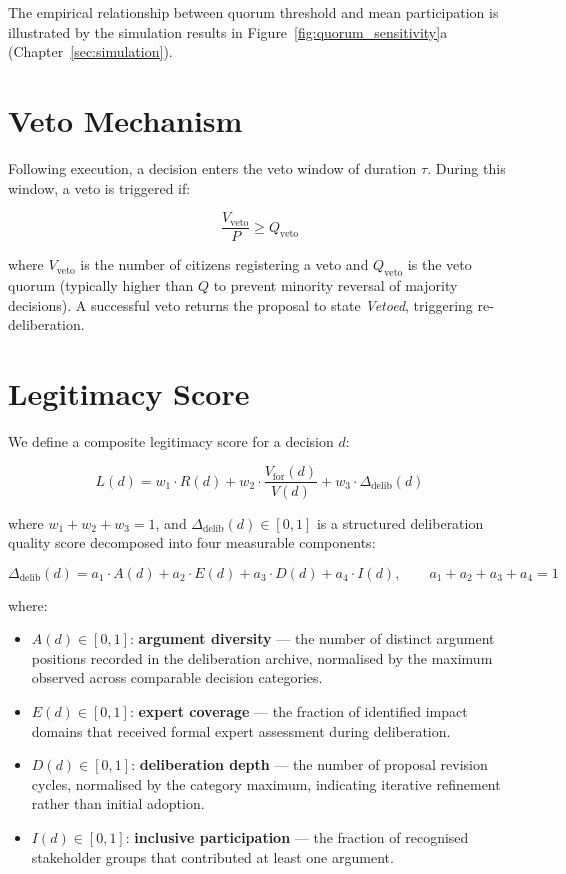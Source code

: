 \documentclass[12pt,a4paper,oneside]{report}
\begin{document}
The empirical relationship between quorum threshold and mean participation is illustrated by the simulation results in Figure~\ref{fig:quorum_sensitivity}a (Chapter~\ref{sec:simulation}).

\section{Veto Mechanism}

Following execution, a decision enters the veto window of duration $\tau$. During this window, a veto is triggered if:

\begin{equation}
  \label{eq:veto}
  \frac{V_{\text{veto}}}{P} \geq Q_{\text{veto}}
\end{equation}

where $V_{\text{veto}}$ is the number of citizens registering a veto and $Q_{\text{veto}}$ is the veto quorum (typically higher than $Q$ to prevent minority reversal of majority decisions). A successful veto returns the proposal to state \textit{Vetoed}, triggering re-deliberation.

\section{Legitimacy Score}

We define a composite legitimacy score for a decision $d$:

\begin{equation}
  \label{eq:legitimacy}
  L(d) = w_1 \cdot R(d) + w_2 \cdot \frac{V_{\text{for}}(d)}{V(d)} + w_3 \cdot \Delta_{\text{delib}}(d)
\end{equation}

where $w_1 + w_2 + w_3 = 1$, and $\Delta_{\text{delib}}(d) \in [0,1]$ is a structured deliberation quality score decomposed into four measurable components:

\begin{equation}
  \label{eq:delib}
  \Delta_{\text{delib}}(d) = a_1 \cdot A(d) + a_2 \cdot E(d) + a_3 \cdot D(d) + a_4 \cdot I(d), \qquad a_1 + a_2 + a_3 + a_4 = 1
\end{equation}

where:
\begin{itemize}
  \item $A(d) \in [0,1]$: \textbf{argument diversity} --- the number of distinct argument positions recorded in the deliberation archive, normalised by the maximum observed across comparable decision categories.
  \item $E(d) \in [0,1]$: \textbf{expert coverage} --- the fraction of identified impact domains that received formal expert assessment during deliberation.
  \item $D(d) \in [0,1]$: \textbf{deliberation depth} --- the number of proposal revision cycles, normalised by the category maximum, indicating iterative refinement rather than initial adoption.
  \item $I(d) \in [0,1]$: \textbf{inclusive participation} --- the fraction of recognised stakeholder groups that contributed at least one argument.
\end{itemize}
\end{document}
